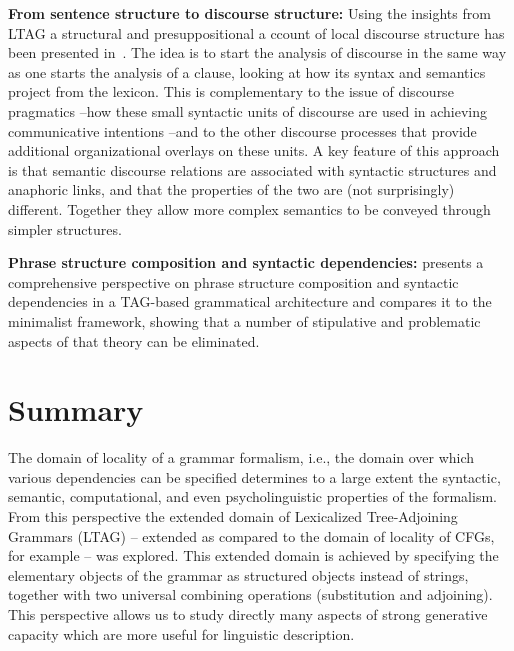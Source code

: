{\bf From sentence structure to discourse structure:} Using the
insights from LTAG a structural and presuppositional a ccount of local
discourse structure has been presented
in~\cite{webber99:_discourse_tag}. The idea is to start the analysis
of discourse in the same way as one starts the analysis of a clause,
looking at how its syntax and semantics project from the lexicon. This
is complementary to the issue of discourse pragmatics --how these
small syntactic units of discourse are used in achieving communicative
intentions --and to the other discourse processes that provide
additional organizational overlays on these units. A key feature of
this approach is that semantic discourse relations are associated with
syntactic structures and anaphoric links, and that the properties of
the two are (not surprisingly) different. Together they allow more
complex semantics to be conveyed through simpler structures.

{\bf Phrase structure composition and syntactic dependencies:}
\cite{frank00:_tag_book} presents a comprehensive perspective on phrase
structure composition and syntactic dependencies in a TAG-based
grammatical architecture and compares it to the minimalist framework,
showing that a number of stipulative and problematic aspects of that
theory can be eliminated.



\section{Summary}

The domain of locality of a grammar formalism, i.e., the domain over
which various dependencies can be specified determines to a large
extent the syntactic, semantic, computational, and even
psycholinguistic properties of the formalism. From this perspective the
extended domain of Lexicalized Tree-Adjoining Grammars (LTAG) --
extended as compared to the domain of locality of CFGs, for example --
was explored. This extended domain is achieved by specifying the
elementary objects of the grammar as structured objects instead of
strings, together with two universal combining operations (substitution
and adjoining). This perspective allows us to study directly many
aspects of strong generative capacity which are more useful for
linguistic description.

